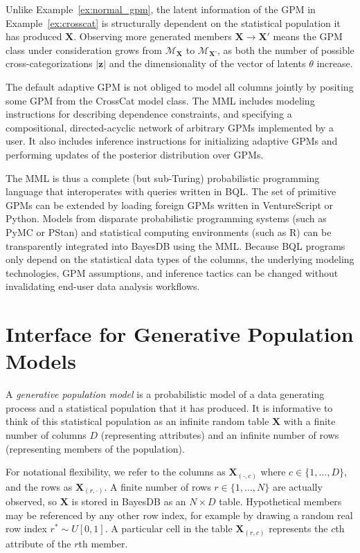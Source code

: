\documentclass[10pt,letterpaper]{article}
\newcommand{\set}[1]{\{#1\}}
\begin{document}
Unlike Example~\ref{ex:normal_gpm}, the latent information of the GPM
in Example~\ref{ex:crosscat} is structurally dependent on
the statistical population it has produced $\mathbf{X}$. Observing more
generated members $\mathbf{X} \to
\mathbf{X}'$ means the GPM class under consideration grows from
$\mathcal{M}_\textbf{X}$ to $\mathcal{M}_\textbf{X'}$, as both the number of
possible cross-categorizations $|\mathbf{z}|$ and the dimensionality of the 
vector of latents $\theta$ increase.


The default adaptive GPM is not obliged to model all columns jointly by
positing some GPM from the CrossCat model class. The MML includes modeling
instructions for describing dependence constraints, and specifying a
compositional, directed-acyclic network of arbitrary GPMs implemented by a user.
It also includes inference instructions for initializing adaptive GPMs and
performing updates of the posterior distribution over GPMs.

The MML is thus a complete (but sub-Turing) probabilistic programming language
that interoperates with queries written in BQL. The set of primitive GPMs
can be extended by loading foreign GPMs written in VentureScript or Python. 
Models from disparate probabilistic programming systems (such as PyMC or PStan) 
and statistical computing environments (such as R) can be transparently 
integrated into BayesDB using the MML. Because BQL programs only depend on the 
statistical data types of the columns, the underlying modeling technologies, 
GPM assumptions, and inference tactics can be changed without invalidating 
end-user data analysis workflows.

\section{Interface for Generative Population Models} \label{sec:generators}
A \textit{generative population model} is a probabilistic model of a data
generating process and a statistical population that it has produced. It is
informative to think of this statistical population as an infinite random table
$\mathbf{X}$ with a finite number of columns $D$ (representing attributes) and
an infinite number of rows (representing members of the population).

For notational flexibility, we refer to the columns
as $\mathbf{X}_{(\cdot,c)}$ where $c \in \set{1, \dots, D}$,
and the rows as $\mathbf{X}_{(r,\cdot)}$. A finite
number of rows $r \in \set{1,\dots,N}$ are actually observed, so 
$\mathbf{X}$ is stored in BayesDB as an $N \times D$ table. Hypothetical 
members may be referenced by any other row index, for example by drawing a 
random real row index $r^*\sim U[0,1]$. A particular cell in the table
$\mathbf{X}_{(r,c)}$ represents the $c$th attribute of the 
$r$th member.
\end{document}
